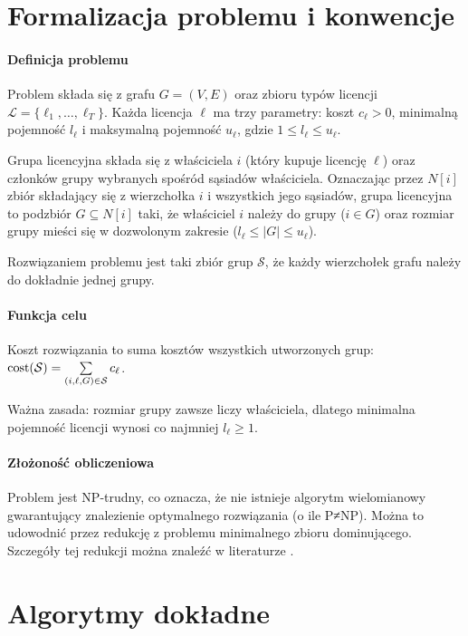 \section{Formalizacja problemu i konwencje}\label{sec:alg-conventions}

\paragraph{Definicja problemu}
Problem składa się z grafu $G=(V,E)$ oraz zbioru typów licencji $\mathcal{L}=\{\ell_1,\dots,\ell_T\}$. Każda licencja $\ell$ ma trzy parametry: koszt $c_\ell>0$, minimalną pojemność $l_\ell$ i maksymalną pojemność $u_\ell$, gdzie $1\le l_\ell\le u_\ell$.

Grupa licencyjna składa się z właściciela $i$ (który kupuje licencję $\ell$) oraz członków grupy wybranych spośród sąsiadów właściciela. Oznaczając przez $N[i]$ zbiór składający się z wierzchołka $i$ i wszystkich jego sąsiadów, grupa licencyjna to podzbiór $G\subseteq N[i]$ taki, że właściciel $i$ należy do grupy ($i\in G$) oraz rozmiar grupy mieści się w dozwolonym zakresie ($l_\ell\le |G|\le u_\ell$).

Rozwiązaniem problemu jest taki zbiór grup $\mathcal{S}$, że każdy wierzchołek grafu należy do dokładnie jednej grupy.

\paragraph{Funkcja celu}
Koszt rozwiązania to suma kosztów wszystkich utworzonych grup: $\operatorname{cost}(\mathcal{S})=\sum\limits_{(i,\ell,G)\in\mathcal{S}} c_\ell$.

Ważna zasada: rozmiar grupy zawsze liczy właściciela, dlatego minimalna pojemność licencji wynosi co najmniej $l_\ell\ge 1$.

\paragraph{Złożoność obliczeniowa}
Problem jest NP-trudny, co oznacza, że nie istnieje algorytm wielomianowy gwarantujący znalezienie optymalnego rozwiązania (o ile P≠NP). Można to udowodnić przez redukcję z problemu minimalnego zbioru dominującego. Szczegóły tej redukcji można znaleźć w literaturze \cite{garey1979,karp1972}.

\section{Algorytmy dokładne}

